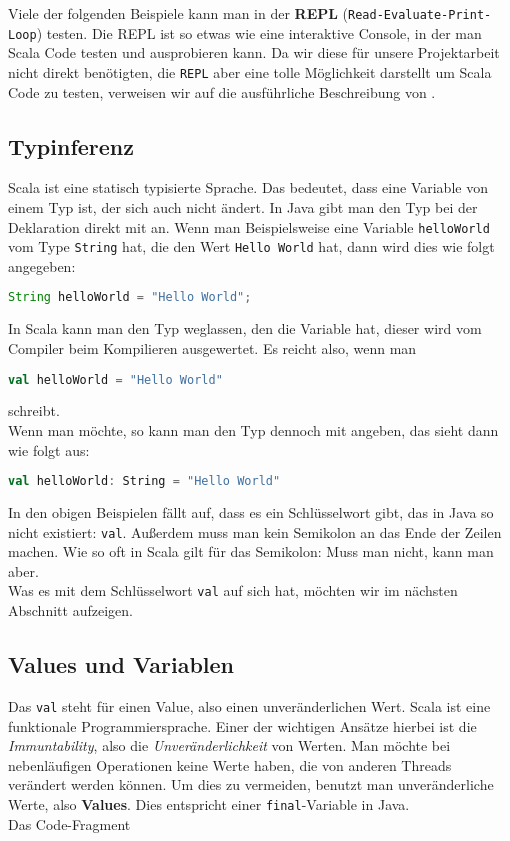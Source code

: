 Viele der folgenden Beispiele kann man in der \textbf{REPL} (\texttt{Read-Evaluate-Print-Loop}) testen. Die REPL ist so etwas wie eine interaktive Console, in der man Scala Code testen und ausprobieren kann. Da wir diese für unsere Projektarbeit nicht direkt benötigten, die \texttt{REPL} aber eine tolle Möglichkeit darstellt um Scala Code zu testen, verweisen wir auf die ausführliche Beschreibung von \cite{GettingStartedWithTheScalaREPL}.

\subsection{Typinferenz}
Scala ist eine statisch typisierte Sprache. Das bedeutet, dass eine Variable von einem Typ ist, der sich auch nicht ändert. In Java gibt man den Typ bei der Deklaration direkt mit an. Wenn man Beispielsweise eine Variable \texttt{helloWorld} vom Type \texttt{String} hat, die den Wert \texttt{Hello World} hat, dann wird dies wie folgt angegeben:

\begin{lstlisting}[language=Java,numbers=none]
String helloWorld = "Hello World";
\end{lstlisting}

In Scala kann man den Typ weglassen, den die Variable hat, dieser wird vom Compiler beim Kompilieren ausgewertet. Es reicht also, wenn man

\begin{lstlisting}[language=Scala,numbers=none]
val helloWorld = "Hello World"
\end{lstlisting}

schreibt.\\
Wenn man möchte, so kann man den Typ dennoch mit angeben, das sieht dann wie folgt aus:

\begin{lstlisting}[language=Scala,numbers=none]
val helloWorld: String = "Hello World"
\end{lstlisting}

In den obigen Beispielen fällt auf, dass es ein Schlüsselwort gibt, das in Java so nicht existiert: \texttt{val}. Außerdem muss man kein Semikolon an das Ende der Zeilen machen. Wie so oft in Scala gilt für das Semikolon: Muss man nicht, kann man aber.\\
Was es mit dem Schlüsselwort \texttt{val} auf sich hat, möchten wir im nächsten Abschnitt aufzeigen.

\subsection{Values und Variablen}
Das \texttt{val} steht für einen Value, also einen unveränderlichen Wert. Scala ist eine funktionale Programmiersprache. Einer der wichtigen Ansätze hierbei ist die \textit{Immuntability}, also die \textit{Unveränderlichkeit} von Werten. Man möchte bei nebenläufigen Operationen keine Werte haben, die von anderen Threads verändert werden können. Um dies zu vermeiden, benutzt man unveränderliche Werte, also \textbf{Values}. Dies entspricht einer \texttt{final}-Variable in Java.\\
Das Code-Fragment

